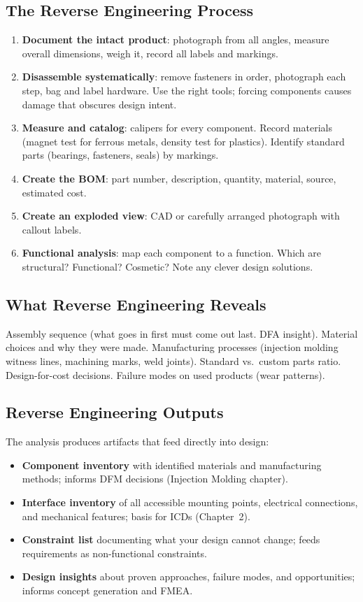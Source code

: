 \subsection{The Reverse Engineering Process}
\begin{enumerate}[leftmargin=1.5em]
\item \textbf{Document the intact product}: photograph from all angles, measure overall dimensions, weigh it, record all labels and markings.
\item \textbf{Disassemble systematically}: remove fasteners in order, photograph each step, bag and label hardware. Use the right tools; forcing components causes damage that obscures design intent.
\item \textbf{Measure and catalog}: calipers for every component. Record materials (magnet test for ferrous metals, density test for plastics). Identify standard parts (bearings, fasteners, seals) by markings.
\item \textbf{Create the BOM}: part number, description, quantity, material, source, estimated cost.
\item \textbf{Create an exploded view}: CAD or carefully arranged photograph with callout labels.
\item \textbf{Functional analysis}: map each component to a function. Which are structural? Functional? Cosmetic? Note any clever design solutions.
\end{enumerate}

\subsection{What Reverse Engineering Reveals}
Assembly sequence (what goes in first must come out last. DFA insight). Material choices and why they were made. Manufacturing processes (injection molding witness lines, machining marks, weld joints). Standard vs.\ custom parts ratio. Design-for-cost decisions. Failure modes on used products (wear patterns).


\subsection{Reverse Engineering Outputs}
The analysis produces artifacts that feed directly into design:
\begin{itemize}[leftmargin=1.5em]
\item \textbf{Component inventory} with identified materials and manufacturing methods; informs DFM decisions (Injection Molding chapter).
\item \textbf{Interface inventory} of all accessible mounting points, electrical connections, and mechanical features; basis for ICDs (Chapter~2).
\item \textbf{Constraint list} documenting what your design cannot change; feeds requirements as non-functional constraints.
\item \textbf{Design insights} about proven approaches, failure modes, and opportunities; informs concept generation and FMEA.
\end{itemize}

